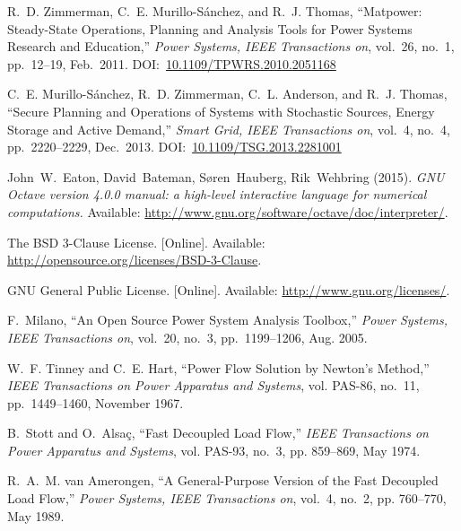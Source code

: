 \documentclass[12pt]{article}
\newcommand{\matpower}[0]{{\sc Matpower}}
\newcommand{\matpowerurl}[0]{http://www.pserc.cornell.edu/matpower/}
\numberwithin{equation}{section}
\numberwithin{table}{section}
\numberwithin{figure}{section}
\begin{document}
\clearpage
\begin{thebibliography}{99}

R.~D. Zimmerman, C.~E. Murillo-S{\'a}nchez, and R.~J. Thomas, ``\matpower{}: Steady-State Operations, Planning and Analysis Tools for Power Systems Research and Education,'' \emph{Power Systems, IEEE Transactions on}, vol.~26, no.~1, pp.~12--19, Feb.~2011. DOI:~\href{https://doi.org/10.1109/TPWRS.2010.2051168}{10.1109/TPWRS.2010.2051168}

C.~E. Murillo-S{\'a}nchez, R.~D. Zimmerman, C.~L. Anderson, and R.~J. Thomas, ``Secure Planning and Operations of Systems with Stochastic Sources, Energy Storage and Active Demand,'' \emph{Smart Grid, IEEE Transactions on}, vol.~4, no.~4, pp.~2220--2229, Dec.~2013.
DOI:~\href{https://doi.org/10.1109/TSG.2013.2281001}{10.1109/TSG.2013.2281001}

John~W.~Eaton, David~Bateman, S{\o}ren~Hauberg, Rik~Wehbring (2015). \emph{GNU Octave version 4.0.0 manual: a high-level interactive language for numerical computations.} Available: \url{http://www.gnu.org/software/octave/doc/interpreter/}.

The BSD 3-Clause License. [Online]. Available: \url{http://opensource.org/licenses/BSD-3-Clause}.

GNU General Public License. [Online]. Available: \url{http://www.gnu.org/licenses/}.

F.~Milano, ``An Open Source Power System Analysis Toolbox,'' \emph{Power
  Systems, IEEE Transactions on}, vol.~20, no.~3, pp.~1199--1206, Aug. 2005.

W.~F. Tinney and C.~E. Hart, ``Power Flow Solution by Newton's Method,''
  \emph{IEEE Transactions on Power Apparatus and Systems}, vol. PAS-86, no.~11,
  pp.~1449--1460, November 1967.

B.~Stott and O.~Alsa{\c c}, ``Fast Decoupled Load Flow,'' \emph{IEEE
  Transactions on Power Apparatus and Systems}, vol. PAS-93, no.~3, pp.
  859--869, May 1974.

R.~A.~M. van Amerongen, ``A General-Purpose Version of the Fast Decoupled Load
  Flow,'' \emph{Power Systems, IEEE Transactions on}, vol.~4, no.~2, pp.
  760--770, May 1989.


\end{thebibliography}
\end{document}
